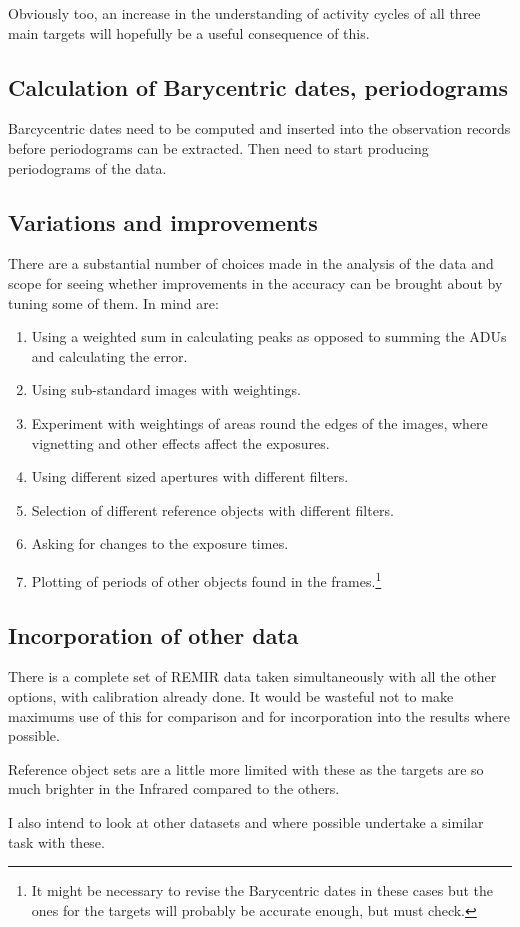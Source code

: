 Obviously too, an increase in the understanding of activity cycles of all three
main targets will hopefully be a useful consequence of this.

\subsection{Calculation of Barycentric dates, periodograms}
\protect\label{section:fwbarycentric}

Barcycentric dates need to be computed and inserted into the observation records
before periodograms can be extracted. Then need to start producing periodograms
of the data.

\subsection{Variations and improvements}
\protect\label{section:fwvariations}

There are a substantial number of choices made in the analysis of the data and
scope for seeing whether improvements in the accuracy can be brought about by
tuning some of them. In mind are:

\begin{enumerate}
  \item Using a weighted sum in calculating peaks as opposed to summing the ADUs
  and calculating the error.
  \item Using sub-standard images with weightings.
  \item Experiment with weightings of areas round the edges of the images, where
  vignetting and other effects affect the exposures.
  \item Using different sized apertures with different filters.
  \item Selection of different reference objects with different filters.
  \item Asking for changes to the exposure times.
  \item Plotting of periods of other objects found in the frames.\footnote{It
  might be necessary to revise the Barycentric dates in these cases but the
  ones for the targets will probably be accurate enough, but must check.}
\end{enumerate}

\subsection{Incorporation of other data}
\protect\label{section:fwincorp}

There is a complete set of REMIR data taken simultaneously with all the other
options, with calibration already done. It would be wasteful not to make
maximums use of this for comparison and for incorporation into the results where
possible.

Reference object sets are a little more limited with these as the {\rdwarf}
targets are so much brighter in the Infrared compared to the others.

I also intend to look at other datasets and where possible undertake a similar
task with these.

\clearpage
